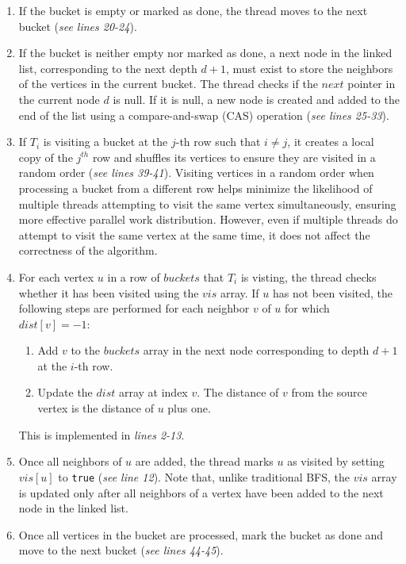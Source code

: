 \begin{enumerate}
    \item If the bucket is empty or marked as done, the thread moves to the next bucket (\textit{see lines 20-24}).
    
    \item If the bucket is neither empty nor marked as done, a next node in the linked list, corresponding to the next depth $d+1$, must exist to store the neighbors of the vertices in the current bucket. The thread checks if the $next$ pointer in the current node $d$ is null. If it is null, a new node is created and added to the end of the list using a compare-and-swap (CAS) operation (\textit{see lines 25-33}).
    
    \item If $T_i$ is visiting a bucket at the $j$-th row such that $i \neq j$, it creates a local copy of the $j^{th}$ row and shuffles its vertices to ensure they are visited in a random order (\textit{see lines 39-41}). Visiting vertices in a random order when processing a bucket from a different row helps minimize the likelihood of multiple threads attempting to visit the same vertex simultaneously, ensuring more effective parallel work distribution. However, even if multiple threads do attempt to visit the same vertex at the same time, it does not affect the correctness of the algorithm.
    
    \item For each vertex $u$ in a row of $buckets$ that $T_i$ is visting, the thread checks whether it has been visited using the $vis$ array. If $u$ has not been visited, the following steps are performed for each neighbor $v$ of $u$ for which $dist[v] = -1$:
    \begin{enumerate}
        \item Add $v$ to the $buckets$ array in the next node corresponding to depth $d+1$ at the $i$-th row.
        \item Update the $dist$ array at index $v$. The distance of $v$ from the source vertex is the distance of $u$ plus one.
    \end{enumerate}
    This is implemented in \textit{lines 2-13}.
    
    \item Once all neighbors of $u$ are added, the thread marks $u$ as visited by setting $vis[u]$ to \texttt{true} (\textit{see line 12}). Note that, unlike traditional BFS, the $vis$ array is updated only after all neighbors of a vertex have been added to the next node in the linked list.

    \item Once all vertices in the bucket are processed, mark the bucket as done and move to the next bucket (\textit{see lines 44-45}).
\end{enumerate}

